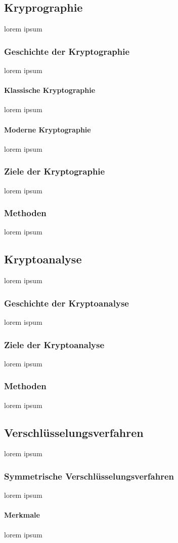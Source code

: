\documentclass[12pt,a4paper]{report}
\begin{document}
\subsection{Kryprographie}
lorem ipsum
\subsubsection{Geschichte der Kryptographie}
lorem ipsum
\paragraph{Klassische Kryptographie}
lorem ipsum
\paragraph{Moderne Kryptographie}
lorem ipsum
\subsubsection{Ziele der Kryptographie}
lorem ipsum
\subsubsection{Methoden}
lorem ipsum
\subsection{Kryptoanalyse}
lorem ipsum
\subsubsection{Geschichte der Kryptoanalyse}
lorem ispum
\subsubsection{Ziele der Kryptoanalyse}
lorem ipsum
\subsubsection{Methoden}
lorem ipsum
\subsection{Verschlüsselungsverfahren}
lorem ipsum
\subsubsection{Symmetrische Verschlüsselungsverfahren}
lorem ipsum
\paragraph{Merkmale}
lorem ipsum
\end{document}

